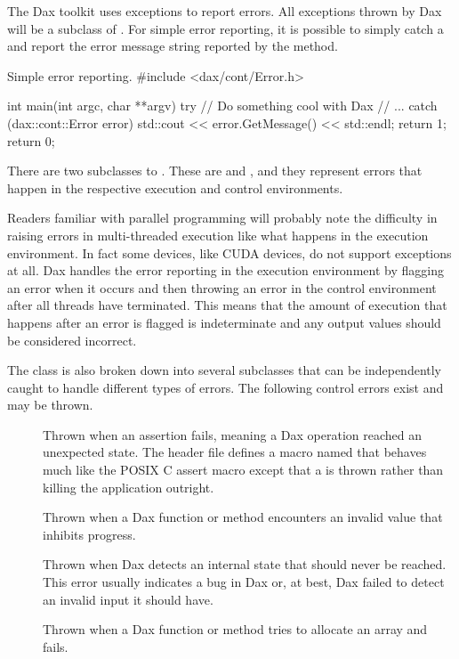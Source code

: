 
The Dax toolkit uses exceptions to report errors. All exceptions thrown by
Dax will be a subclass of . For simple error reporting, it
is possible to simply catch a  and report the error message
string reported by the  method.

\begin{daxexample}{Simple error reporting.}
#include <dax/cont/Error.h>

int main(int argc, char **argv)
{
  try
    {
    // Do something cool with Dax
    // ...
    }
  catch (dax::cont::Error error)
    {
    std::cout << error.GetMessage() << std::endl;
    return 1;
    }
  return 0;
}
\end{daxexample}

There are two subclasses to . These are
 and , and they represent
errors that happen in the respective execution and control environments.

Readers familiar with parallel programming will probably note the
difficulty in raising errors in multi-threaded execution like what happens
in the execution environment. In fact some devices, like CUDA devices, do
not support exceptions at all. Dax handles the error reporting in the
execution environment by flagging an error when it occurs and then throwing
an error in the control environment after all threads have terminated. This
means that the amount of execution that happens after an error is flagged
is indeterminate and any output values should be considered incorrect.

The  class is also broken down into several
subclasses that can be independently caught to handle different types of
errors. The following control errors exist and may be thrown.
\begin{description}
\item[]  Thrown when an assertion
  fails, meaning a Dax operation reached an unexpected state. The header
  file  defines a macro named
   that behaves much like the POSIX C assert
  macro except that a  is thrown rather
  than killing the application outright.
\item[] Thrown when a Dax function or method
  encounters an invalid value that inhibits progress.
\item[] Thrown when Dax detects an internal
  state that should never be reached. This error usually indicates a bug in
  Dax or, at best, Dax failed to detect an invalid input it should have.
\item[] Thrown when a Dax function or
  method tries to allocate an array and fails.
\end{description}

